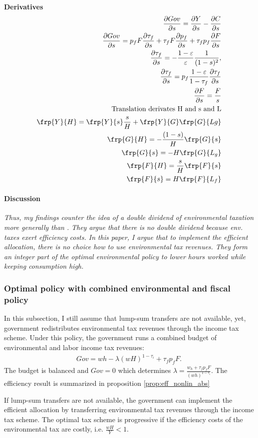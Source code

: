 \textbf{Derivatives}
\begin{align}
\frac{\partial Gov}{\partial s}=\frac{\partial Y}{\partial s}-\frac{\partial C}{\partial s}\\
\frac{\partial Gov}{\partial s}=p_f F \frac{\partial \tau_f}{\partial s}+\tau_f F \frac{\partial p_f}{\partial s}+\tau_f p_f \frac{\partial F}{\partial s}\\
\frac{\partial \tau_f}{\partial s}= -\frac{1-\varepsilon}{\varepsilon}\frac{1}{(1-s)^2}, \\
\frac{\partial \tau_f}{\partial s}=p_f\frac{1-\varepsilon}{1-\tau_f}\frac{\partial \tau_f}{\partial s}\\
\frac{\partial F}{\partial s}=\frac{F}{s}
\\
\text{Translation derivates H and s and L}\\
\frp{Y}{H}= \frp{Y}{s}\frac{s}{H}+\frp{Y}{G}\frp{G}{Lg}
\\
\frp{G}{H}=-\frac{(1-s)}{H}\frp{G}{s}
\\\frp{G}{s}=-H\frp{G}{L_g}\\
\frp{F}{H}=\frac{s}{H}\frp{F}{s}\\
\frp{F}{s}=H\frp{F}{L_f}
\end{align}

\paragraph{Discussion}
\textit{Thus, my findings counter the idea of a double dividend of environmental taxation more generally than \cite{LansBovenberg1994EnvironmentalTaxation}. They argue that there is no double dividend because env. taxes exert efficiency costs. In this paper, I argue that to implement the efficient allocation, there is no choice how to use environmental tax revenues. They form an integer part of the optimal environmental policy to lower hours worked while keeping consumption high.}

\subsubsection{Optimal policy with combined environmental and fiscal policy}

In this subsection, I still assume that lump-sum transfers are not available, yet, government redistributes environmental tax revenues through the income tax scheme.
Under this policy, the government runs a combined budget of environmental and labor income tax revenues:  
\begin{align}
Gov= wh-\lambda (wH)^{1-\tau_\iota}+\tau_f p_fF.
\end{align}
The budget is balanced and $Gov = 0$ which determines $\lambda=\frac{w_h + \tau_f p_f F}{(wh)^{1-\tau_{\iota}}}$. The efficiency result is summarized in proposition \ref{prop:eff_nonlin_abs}
\begin{prop}\label{prop:eff_nonlin_abs}
	If lump-sum transfers are not available, the government can implement the efficient allocation by  transferring environmental tax revenues through the income tax scheme. The optimal tax scheme is progressive if the efficiency costs of the environmental tax are costly, i.e. $\frac{wH}{Y}<1$.
\end{prop}


